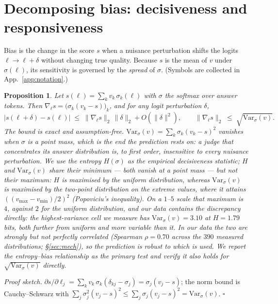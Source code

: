 \documentclass[11pt]{article}
\newtheorem{proposition}{Proposition}
\begin{document}
\section{Decomposing bias: decisiveness and responsiveness}\label{sec:theory}
Bias is the change in the score $s$ when a nuisance perturbation shifts the logits
$\ell \to \ell + \delta$ without changing true quality. Because $s$ is the mean of
$v$ under $\sigma(\ell)$, its sensitivity is governed by the \emph{spread} of
$\sigma$. (Symbols are collected in App.~\ref{app:notation}.)

\begin{proposition}\label{prop:main}
Let $s(\ell)=\sum_k v_k\,\sigma_k(\ell)$ with $\sigma$ the softmax over answer tokens.
Then $\nabla_\ell s = \big(\sigma_k(v_k-s)\big)_k$, and for any logit perturbation
$\delta$,
\[
|s(\ell+\delta)-s(\ell)| \;\le\; \|\nabla_\ell s\|_2\,\|\delta\|_2 + O(\|\delta\|^2),
\qquad
\|\nabla_\ell s\|_2 \;\le\; \sqrt{\mathrm{Var}_\sigma(v)} .
\]
The bound is exact and assumption-free. $\mathrm{Var}_\sigma(v)=\sum_k\sigma_k(v_k-s)^2$
vanishes when $\sigma$ is a point mass, which is the end the prediction rests on: a judge
that concentrates its answer distribution is, to first order, insensitive to \emph{every}
nuisance perturbation. We use the entropy $H(\sigma)$ as the empirical decisiveness
statistic; $H$ and $\mathrm{Var}_\sigma(v)$ share their minimum --- both vanish at a point
mass --- but not their maximum: $H$ is maximised by the uniform distribution, whereas
$\mathrm{Var}_\sigma(v)$ is maximised by the two-point distribution on the extreme
values, where it attains $((v_{\max}-v_{\min})/2)^2$ (Popoviciu's inequality). On a
$1$--$5$ scale that maximum is $4$, against $2$ for the uniform distribution, and our
data contains the discrepancy directly: the highest-variance cell we measure has
$\mathrm{Var}_\sigma(v)=3.10$ at $H=1.79$ bits, both further from uniform and more
variable than it. In our data the two are
strongly but not perfectly correlated (Spearman $\rho=0.70$ across the
$390$ measured distributions; \S\ref{sec:mech}), so the prediction is robust to
which is used. We
report the entropy--bias relationship as the primary test and verify it also holds for
$\sqrt{\mathrm{Var}_\sigma(v)}$ directly.
\end{proposition}

\noindent\emph{Proof sketch.} $\partial s/\partial \ell_j=\sum_k v_k\,\sigma_k(\delta_{kj}-\sigma_j)
=\sigma_j(v_j-s)$; the norm bound is Cauchy--Schwarz with
$\sum_j\sigma_j^2(v_j-s)^2\le\sum_j\sigma_j(v_j-s)^2=\mathrm{Var}_\sigma(v)$. $\square$
\end{document}
